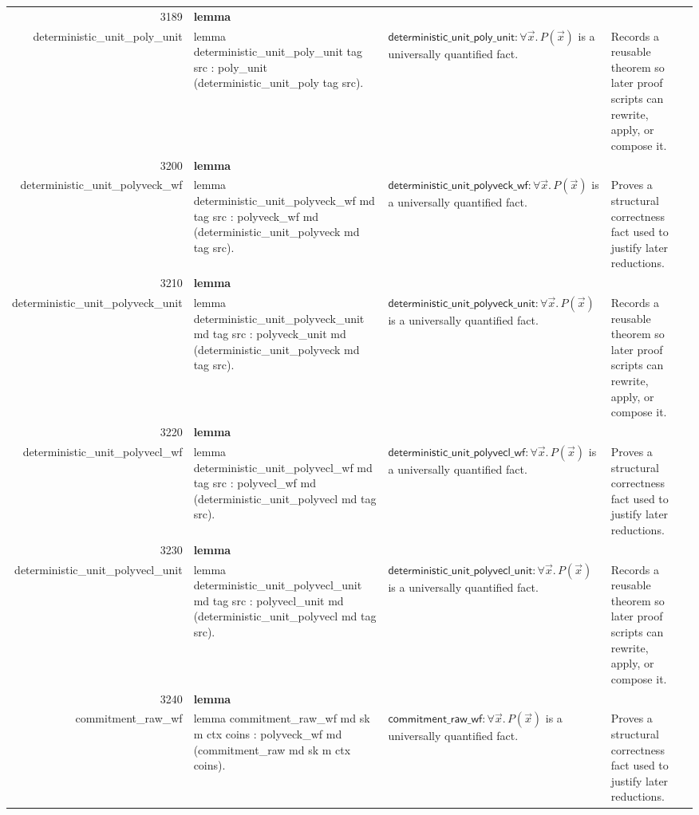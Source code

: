 \documentclass[10pt]{article}
\newcommand{\ec}[1]{\begingroup\ttfamily\scriptsize #1\endgroup}
\begin{document}
\begin{longtable}{r L{0.17\textwidth} L{0.26\textwidth} L{0.27\textwidth} L{0.20\textwidth}}
3189 & \textbf{lemma}\\\ec{deterministic\_unit\_poly\_unit} & \ec{lemma deterministic\_unit\_poly\_unit tag src : poly\_unit (deterministic\_unit\_poly tag src).} & \(\mathsf{deterministic\_unit\_poly\_unit} : \forall \vec{x}.\, P(\vec{x})\) is a universally quantified fact. & Records a reusable theorem so later proof scripts can rewrite, apply, or compose it. \\
3200 & \textbf{lemma}\\\ec{deterministic\_unit\_polyveck\_wf} & \ec{lemma deterministic\_unit\_polyveck\_wf md tag src : polyveck\_wf md (deterministic\_unit\_polyveck md tag src).} & \(\mathsf{deterministic\_unit\_polyveck\_wf} : \forall \vec{x}.\, P(\vec{x})\) is a universally quantified fact. & Proves a structural correctness fact used to justify later reductions. \\
3210 & \textbf{lemma}\\\ec{deterministic\_unit\_polyveck\_unit} & \ec{lemma deterministic\_unit\_polyveck\_unit md tag src : polyveck\_unit md (deterministic\_unit\_polyveck md tag src).} & \(\mathsf{deterministic\_unit\_polyveck\_unit} : \forall \vec{x}.\, P(\vec{x})\) is a universally quantified fact. & Records a reusable theorem so later proof scripts can rewrite, apply, or compose it. \\
3220 & \textbf{lemma}\\\ec{deterministic\_unit\_polyvecl\_wf} & \ec{lemma deterministic\_unit\_polyvecl\_wf md tag src : polyvecl\_wf md (deterministic\_unit\_polyvecl md tag src).} & \(\mathsf{deterministic\_unit\_polyvecl\_wf} : \forall \vec{x}.\, P(\vec{x})\) is a universally quantified fact. & Proves a structural correctness fact used to justify later reductions. \\
3230 & \textbf{lemma}\\\ec{deterministic\_unit\_polyvecl\_unit} & \ec{lemma deterministic\_unit\_polyvecl\_unit md tag src : polyvecl\_unit md (deterministic\_unit\_polyvecl md tag src).} & \(\mathsf{deterministic\_unit\_polyvecl\_unit} : \forall \vec{x}.\, P(\vec{x})\) is a universally quantified fact. & Records a reusable theorem so later proof scripts can rewrite, apply, or compose it. \\
3240 & \textbf{lemma}\\\ec{commitment\_raw\_wf} & \ec{lemma commitment\_raw\_wf md sk m ctx coins : polyveck\_wf md (commitment\_raw md sk m ctx coins).} & \(\mathsf{commitment\_raw\_wf} : \forall \vec{x}.\, P(\vec{x})\) is a universally quantified fact. & Proves a structural correctness fact used to justify later reductions. \\

\end{longtable}
\end{document}
